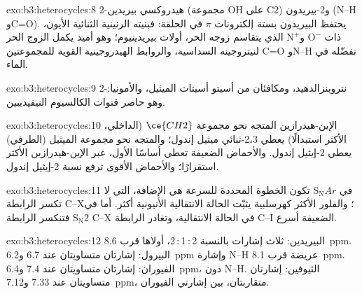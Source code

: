 \begin{solution}{exo:b3:heterocycles:8}
2-هيدروكسي بيريدين (مجموعة OH على C2) و2-بيريدون (N--H وC=O). يحتفظ البيريدون بستة
إلكترونات $\pi$ في الحلقة: فبنيته الرنينية الثنائية الأيون، ذات $\mathrm{O^-}$ 
و$\mathrm{N^+}$ الذي يتقاسم زوجه الحر، أولات بيريدينيوم؛ وهو أميد يكمل
الزوج الحر لنيتروجينه السداسية، والروابط الهيدروجينية القوية للمجموعتين C=O وN--H
تفضّله في الماء.
\end{solution}

\begin{solution}{exo:b3:heterocycles:9}
2-نتروبنزالدهيد، ومكافئان من أسيتو أسيتات الميثيل، والأمونيا: وهو
حاصر قنوات الكالسيوم النيفيديبين.
\end{solution}

\begin{solution}{exo:b3:heterocycles:10}
الإين-هيدرازين المتجه نحو مجموعة $\ce{CH2}$ (الداخلي، الأكثر استبدالًا) يعطي
2،3-ثنائي ميثيل إندول؛ والمتجه نحو مجموعة الميثيل (الطرفي) يعطي 2-إيثيل إندول.
والأحماض الضعيفة تعطي أساسًا الأول، عبر الإين-هيدرازين الأكثر استقرارًا؛ 
والأحماض الأقوى ترفع نسبة 2-إيثيل إندول.
\end{solution}

\begin{solution}{exo:b3:heterocycles:11}
في $\mathrm S_\mathrm NAr$ تكون الخطوة المحددة للسرعة هي الإضافة، التي لا تكسر الرابطة C--X؛
والفلور الأكثر كهرسلبية يثبّت الحالة الانتقالية الأنيونية
 أكثر. أما في $\mathrm S_\mathrm N2$ فتنكسر الرابطة C--X في
الحالة الانتقالية، وتغادر الرابطة C--I الضعيفة أسرع.
\end{solution}

\begin{solution}{exo:b3:heterocycles:12}
البيريدين: ثلاث إشارات بالنسبة 2\,:\,1\,:\,2، أولاها قرب \qty{8.6}{ppm}. البيرول: إشارتان
متساويتان عند 6.7 و\qty{6.2}{ppm} وإشارة N--H عريضة قرب \qty{8.1}{ppm}. الفيوران: إشارتان متساويتان عند
7.4 و\qty{6.4}{ppm}، دون N--H. الثيوفين: إشارتان متساويتان عند 7.33 و\qty{7.12}{ppm}، متقاربتان،
بين إشارتي الفيوران.
\end{solution}

